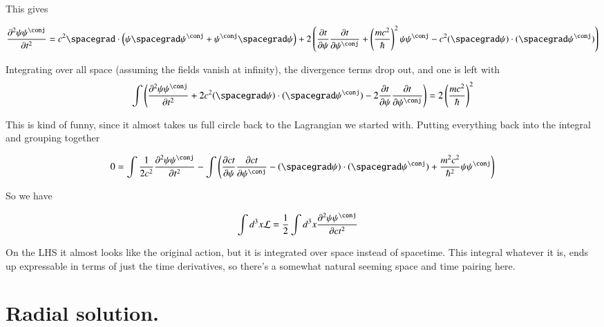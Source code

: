 \documentclass{article}
\newcommand{\PDSq}[2]{\frac{\partial^2 {#2}}{\partial {#1}^2}}
\begin{document}
This gives

\begin{align*}
\PDSq{t}{\psi\psi^\conj} 
&= 
c^2 \spacegrad \cdot \left( \psi \spacegrad \psi^\conj +\psi^\conj \spacegrad \psi \right)
+ 2 \left( 
\PD{t}{\psi}\PD{t}{\psi^\conj} + \left( \frac{m c^2}{\hbar} \right)^2 \psi \psi^\conj 
-c^2 (\spacegrad \psi) \cdot (\spacegrad \psi^\conj) 
\right)
\\
\end{align*}

Integrating over all space (assuming the fields vanish at infinity), the divergence terms drop out, and one is left with
\begin{align*}
\int \left( \PDSq{t}{\psi\psi^\conj} 
+ 2 c^2 (\spacegrad \psi) \cdot (\spacegrad \psi^\conj) 
- 2 \PD{t}{\psi}\PD{t}{\psi^\conj}  \right) 
&= 
2 \left( \frac{m c^2}{\hbar} \right)^2 
\\
\end{align*}

This is kind of funny, since it almost takes us full circle back to the Lagrangian we started with.  Putting everything 
back into the integral and grouping together 

\begin{align*}
0 &=
\int \inv{2 c^2} \PDSq{t}{\psi\psi^\conj} 
- \int 
\left(
\PD{ct}{\psi}\PD{ct}{\psi^\conj}  
- (\spacegrad \psi) \cdot (\spacegrad \psi^\conj) 
+ \frac{m^2 c^2}{\hbar^2} \psi \psi^\conj
\right)
\\
\end{align*}

So we have

\begin{align*}
\int d^3 x \LL &= \inv{2} \int d^3 x \PDSq{ct}{\psi\psi^\conj} 
\end{align*}

On the LHS it almost looks like the original action, but it is integrated over space instead of spacetime.  This integral 
whatever it is, ends up expressable in terms of just the time derivatives, so there's a somewhat natural seeming space and time
pairing here.

\section{ Radial solution. }
\end{document}
